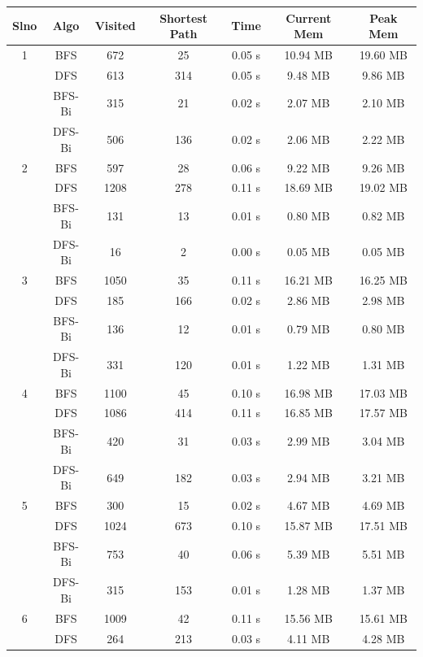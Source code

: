 \documentclass[final, journal, 11pt]{report}
\begin{document}
	\begin{table}[!htbp]
	\centering
	\begin{tabular}{@{}ccccccc@{}}
	\toprule
	\textbf{Slno} & \textbf{Algo} & \textbf{Visited} & \textbf{Shortest Path} & \textbf{Time} & \textbf{Current Mem} & \textbf{Peak Mem} \\ \midrule
	1 & BFS       & 672  & 25   & 0.05 s & 10.94 MB & 19.60 MB \\
	  & DFS       & 613  & 314  & 0.05 s & 9.48 MB  & 9.86 MB  \\
	  & BFS-Bi    & 315  & 21   & 0.02 s & 2.07 MB  & 2.10 MB  \\
	  & DFS-Bi    & 506  & 136  & 0.02 s & 2.06 MB  & 2.22 MB  \\ \midrule
	2 & BFS       & 597  & 28   & 0.06 s & 9.22 MB  & 9.26 MB  \\
	  & DFS       & 1208 & 278  & 0.11 s & 18.69 MB & 19.02 MB \\
	  & BFS-Bi    & 131  & 13   & 0.01 s & 0.80 MB  & 0.82 MB  \\
	  & DFS-Bi    & 16   & 2    & 0.00 s & 0.05 MB  & 0.05 MB  \\ \midrule
	3 & BFS       & 1050 & 35   & 0.11 s & 16.21 MB & 16.25 MB \\
	  & DFS       & 185  & 166  & 0.02 s & 2.86 MB  & 2.98 MB  \\
	  & BFS-Bi    & 136  & 12   & 0.01 s & 0.79 MB  & 0.80 MB  \\
	  & DFS-Bi    & 331  & 120  & 0.01 s & 1.22 MB  & 1.31 MB  \\ \midrule
	4 & BFS       & 1100 & 45   & 0.10 s & 16.98 MB & 17.03 MB \\
	  & DFS       & 1086 & 414  & 0.11 s & 16.85 MB & 17.57 MB \\
	  & BFS-Bi    & 420  & 31   & 0.03 s & 2.99 MB  & 3.04 MB  \\
	  & DFS-Bi    & 649  & 182  & 0.03 s & 2.94 MB  & 3.21 MB  \\ \midrule
	5 & BFS       & 300  & 15   & 0.02 s & 4.67 MB  & 4.69 MB  \\
	  & DFS       & 1024 & 673  & 0.10 s & 15.87 MB & 17.51 MB \\
	  & BFS-Bi    & 753  & 40   & 0.06 s & 5.39 MB  & 5.51 MB  \\
	  & DFS-Bi    & 315  & 153  & 0.01 s & 1.28 MB  & 1.37 MB  \\ \midrule
	6 & BFS       & 1009 & 42   & 0.11 s & 15.56 MB & 15.61 MB \\
	  & DFS       & 264  & 213  & 0.03 s & 4.11 MB  & 4.28 MB  \\

\end{tabular}
\end{table}
\end{document}
